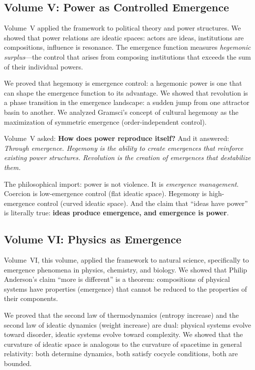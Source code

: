 \subsection{Volume V: Power as Controlled Emergence}

Volume~V applied the framework to political theory and power structures. We
showed that power relations are ideatic spaces: actors are ideas, institutions
are compositions, influence is resonance. The emergence function measures
\emph{hegemonic surplus}---the control that arises from composing institutions
that exceeds the sum of their individual powers.

We proved that hegemony is emergence control: a hegemonic power is one that
can shape the emergence function to its advantage. We showed that revolution
is a phase transition in the emergence landscape: a sudden jump from one
attractor basin to another. We analyzed Gramsci's concept of cultural hegemony
as the maximization of symmetric emergence (order-independent control).

Volume~V asked: \textbf{How does power reproduce itself?} And it answered:
\emph{Through emergence. Hegemony is the ability to create emergences that
reinforce existing power structures. Revolution is the creation of emergences
that destabilize them.}

The philosophical import: power is not violence. It is \emph{emergence
management}. Coercion is low-emergence control (flat ideatic space). Hegemony
is high-emergence control (curved ideatic space). And the claim that ``ideas
have power'' is literally true: \textbf{ideas produce emergence, and emergence
is power}.

\subsection{Volume VI: Physics as Emergence}

Volume~VI, this volume, applied the framework to natural science, specifically
to emergence phenomena in physics, chemistry, and biology. We showed that
Philip Anderson's claim ``more is different'' is a theorem: compositions of
physical systems have properties (emergence) that cannot be reduced to the
properties of their components.

We proved that the second law of thermodynamics (entropy increase) and the
second law of ideatic dynamics (weight increase) are dual: physical systems
evolve toward disorder, ideatic systems evolve toward complexity. We showed
that the curvature of ideatic space is analogous to the curvature of spacetime
in general relativity: both determine dynamics, both satisfy cocycle
conditions, both are bounded.

